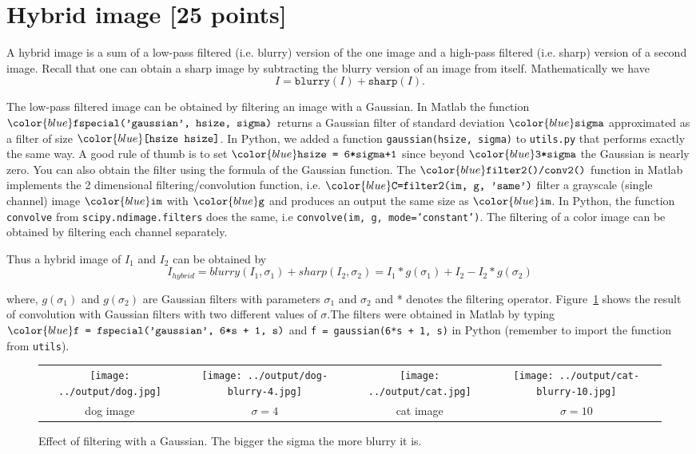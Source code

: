 \documentclass[10pt,letterpaper]{article}
\newcommand{\cmd}[1] {{\color{blue}\texttt{#1}}}
\begin{document}
\section{Hybrid image [25 points]}
A hybrid image is a sum of a low-pass filtered (i.e. blurry) version of the one image and a high-pass filtered (i.e. sharp) version of a second image. Recall that one can obtain a sharp image by subtracting the blurry version of an image from itself. Mathematically we have
\[
	I = \texttt{blurry}(I) + \texttt{sharp}(I).
\]

The low-pass filtered image can be obtained by filtering an image with a Gaussian. In Matlab the function $\cmd{fspecial('gaussian', hsize, sigma)}$ returns a Gaussian filter of standard deviation $\cmd{sigma}$ approximated as a filter of size 
$\cmd{[hsize hsize]}$. In Python, we added a function \cmd{gaussian(hsize, sigma)} to \cmd{utils.py} that performs exactly the same way. A good rule of thumb is to set $\cmd{hsize = 6*sigma+1}$ since beyond $\cmd{3*sigma}$ the Gaussian is nearly zero. You can also obtain the filter using the formula of the Gaussian function. 
The $\cmd{filter2()/conv2()}$ function in Matlab implements the 2 dimensional filtering/convolution function, i.e. $\cmd{C=filter2(im, g, 'same')}$ filter a grayscale (single channel) image $\cmd{im}$ with $\cmd{g}$ and produces an output the same size as $\cmd{im}$. In Python, the function \cmd{convolve} from \cmd{scipy.ndimage.filters} does the same, i.e \cmd{convolve(im, g, mode='constant')}. The filtering of a color image can be obtained by filtering each channel separately. 


Thus a hybrid image of $I_1$ and $I_2$ can be obtained by
\begin{equation}\label{eq:hybrid}
	I_{hybrid} = blurry(I_1, \sigma_1) + sharp(I_2, \sigma_2) = I_1 * g(\sigma_1) + I_2 - I_2*g(\sigma_2)
\end{equation}

where, $g(\sigma_1)$ and $g(\sigma_2)$ are Gaussian filters with parameters $\sigma_1$ and $\sigma_2$ and * denotes the filtering operator. Figure~\ref{fig:blur} shows the result of convolution with Gaussian filters with two different values of $\sigma$.The filters were obtained in Matlab by typing $\cmd{f = fspecial('gaussian', 6*s + 1, s)}$ and \cmd{f = gaussian(6*s + 1, s)} in Python (remember to import the function from \cmd{utils}).


\begin{figure}
\begin{tabular}{cccc}
\texttt{[image: ../output/dog.jpg]} &
\texttt{[image: ../output/dog-blurry-4.jpg]} & 
\texttt{[image: ../output/cat.jpg]} &
\texttt{[image: ../output/cat-blurry-10.jpg]}\\
dog image & $\sigma=4$ & cat image & $\sigma=10$ \\
\end{tabular}
\caption{\label{fig:blur} Effect of filtering with a Gaussian. The bigger the sigma the more blurry it is.}
\end{figure}
\end{document}

